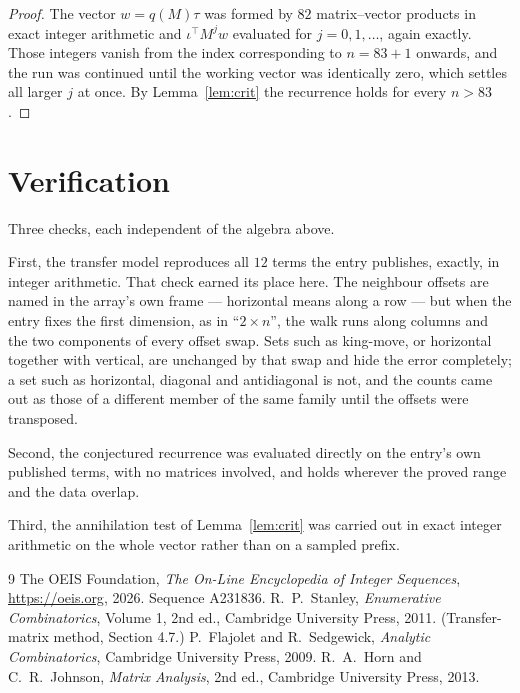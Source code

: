 \documentclass[11pt,a4paper]{article}
\theoremstyle{plain}
\theoremstyle{definition}
\begin{document}
\begin{proof}
The vector $w=q(M)\tau$ was formed by $82$ matrix--vector products in exact integer
arithmetic and $\iota^{\!\top}M^{j}w$ evaluated for $j=0,1,\dots$, again exactly. Those
integers vanish from the index corresponding to $n=83+1$ onwards, and the run was
continued until the working vector was identically zero, which settles all larger $j$ at once.
By Lemma~\ref{lem:crit} the recurrence holds for every $n>83$.
\end{proof}

\section{Verification}

Three checks, each independent of the algebra above.

First, the transfer model reproduces all $12$ terms the entry publishes, exactly, in
integer arithmetic. That check earned its place here. The neighbour offsets are named in the
array's own frame --- horizontal means along a row --- but when the entry fixes the first
dimension, as in ``$2\times n$'', the walk runs along columns and the two components of every
offset swap. Sets such as king-move, or horizontal together with vertical, are unchanged by
that swap and hide the error completely; a set such as horizontal, diagonal and antidiagonal
is not, and the counts came out as those of a different member of the same family until the
offsets were transposed.

Second, the conjectured recurrence was evaluated directly on the entry's own published terms,
with no matrices involved, and holds wherever the proved range and the data overlap.

Third, the annihilation test of Lemma~\ref{lem:crit} was carried out in exact integer
arithmetic on the whole vector rather than on a sampled prefix.

\begin{thebibliography}{9}
 The OEIS Foundation, \emph{The On-Line Encyclopedia of Integer
Sequences}, \url{https://oeis.org}, 2026. Sequence A231836.
 R.~P.~Stanley, \emph{Enumerative Combinatorics}, Volume 1, 2nd ed.,
Cambridge University Press, 2011. (Transfer-matrix method, Section 4.7.)
 P.~Flajolet and R.~Sedgewick, \emph{Analytic Combinatorics}, Cambridge
University Press, 2009.
 R.~A.~Horn and C.~R.~Johnson, \emph{Matrix Analysis}, 2nd ed., Cambridge
University Press, 2013.
\end{thebibliography}
\end{document}
